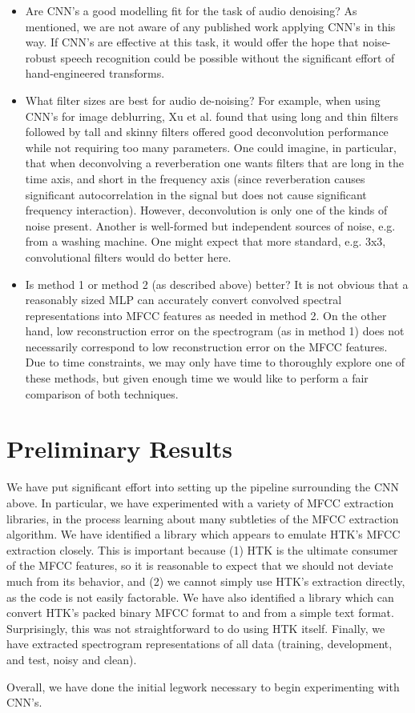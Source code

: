 \documentclass[11pt]{article}
\begin{document}
\begin{itemize}
\item Are CNN's a good modelling fit for the task of audio denoising? As mentioned, we are not aware of any published work applying CNN's in this way. If CNN's are effective at this task, it would offer the hope that noise-robust speech recognition could be possible without the significant effort of hand-engineered transforms.
\item What filter sizes are best for audio de-noising? For example, when using CNN's for image deblurring, Xu et al. found that using long and thin filters followed by tall and skinny filters offered good deconvolution performance while not requiring too many parameters\cite{cnndenoising}. One could imagine, in particular, that when deconvolving a reverberation one wants filters that are long in the time axis, and short in the frequency axis (since reverberation causes significant autocorrelation in the signal but does not cause significant frequency interaction). However, deconvolution is only one of the kinds of noise present. Another is well-formed but independent sources of noise, e.g. from a washing machine. One might expect that more standard, e.g. 3x3, convolutional filters would do better here.
\item Is method 1 or method 2 (as described above) better? It is not obvious that a reasonably sized MLP can accurately convert convolved spectral representations into MFCC features as needed in method 2. On the other hand, low reconstruction error on the spectrogram (as in method 1) does not necessarily correspond to low reconstruction error on the MFCC features. Due to time constraints, we may only have time to thoroughly explore one of these methods, but given enough time we would like to perform a fair comparison of both techniques.
\end{itemize}


\section{Preliminary Results}

\begin{comment}
State and evaluate your results up to the milestone
\end{comment}

We have put significant effort into setting up the pipeline surrounding the CNN above. In particular, we have experimented with a variety of MFCC extraction libraries, in the process learning about many subtleties of the MFCC extraction algorithm. We have identified a library which appears to emulate HTK's MFCC extraction closely. This is important because (1) HTK is the ultimate consumer of the MFCC features, so it is reasonable to expect that we should not deviate much from its behavior, and (2) we cannot simply use HTK's extraction directly, as the code is not easily factorable. We have also identified a library which can convert HTK's packed binary MFCC format to and from a simple text format. Surprisingly, this was not straightforward to do using HTK itself. Finally, we have extracted spectrogram representations of all data (training, development, and test, noisy and clean). 

Overall, we have done the initial legwork necessary to begin experimenting with CNN's.

\footnotesize
{}

\end{document}
